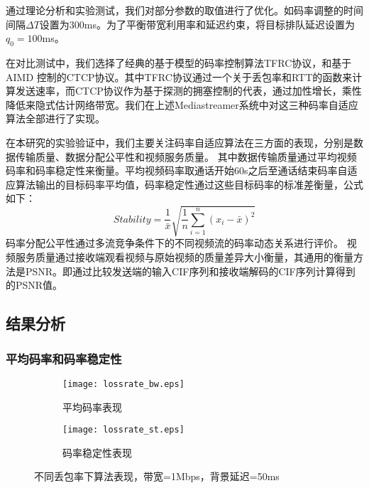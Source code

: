     通过理论分析和实验测试，我们对部分参数的取值进行了优化。如码率调整的时间间隔$\Delta T$设置为300ms。为了平衡带宽利用率和延迟约束，将目标排队延迟设置为$q_0 = 100$ms。

    在对比测试中，我们选择了经典的基于模型的码率控制算法TFRC协议，和基于AIMD 控制的CTCP协议。其中TFRC协议通过一个关于丢包率和RTT的函数来计算发送速率，而CTCP协议作为基于探测的拥塞控制的代表，通过加性增长，乘性降低来隐式估计网络带宽。我们在上述Mediastreamer系统中对这三种码率自适应算法全部进行了实现。

    在本研究的实验验证中，我们主要关注码率自适应算法在三方面的表现，分别是数据传输质量、数据分配公平性和视频服务质量。
    其中数据传输质量通过平均视频码率和码率稳定性来衡量。平均视频码率取通话开始60s之后至通话结束码率自适应算法输出的目标码率平均值，码率稳定性通过这些目标码率的标准差衡量，公式如下：
    \begin{displaymath} \label{eq:throughput}
    Stability = \frac{1}{\bar{x}}\sqrt{ \frac{1}{n} \sum_{i=1}^{n}(x_i-\bar{x})^2 }
    \end{displaymath}
    码率分配公平性通过多流竞争条件下的不同视频流的码率动态关系进行评价。
    视频服务质量通过接收端观看视频与原始视频的质量差异大小衡量，其通用的衡量方法是PSNR。即通过比较发送端的输入CIF序列和接收端解码的CIF序列计算得到的PSNR值。

    \subsection{结果分析}

        \subsubsection{平均码率和码率稳定性}

        \begin{figure}[htbp]
          \begin{subfigure}[b]{0.5\textwidth}
            \centering
            \texttt{[image: lossrate\_bw.eps]}
            \caption{平均码率表现}
            \label{pic:lossrate_bw}
          \end{subfigure}
          \begin{subfigure}[b]{0.5\textwidth}
            \centering
            \texttt{[image: lossrate\_st.eps]}
            \caption{码率稳定性表现}
            \label{pic:lossrate_st}
          \end{subfigure}
          \caption{不同丢包率下算法表现，带宽=1Mbps，背景延迟=50ms}
          \label{pic:lossrate}
        \end{figure}

